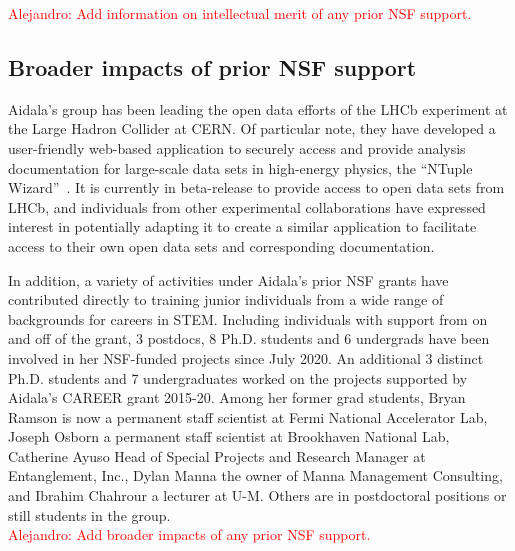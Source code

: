 \textcolor{red}{Alejandro: Add information on intellectual merit of any prior NSF support.}



\subsection{Broader impacts of prior NSF support}
Aidala's group has been leading the open data efforts of the LHCb experiment at the Large Hadron Collider at CERN.  Of particular note, they have developed a user-friendly web-based application to securely access and provide analysis documentation for large-scale data sets in high-energy physics, the ``NTuple Wizard''~\cite{Aidala:2023dai}.  It is currently in beta-release to provide access to open data sets from LHCb, and individuals from other experimental collaborations have expressed interest in potentially adapting it to create a similar application to facilitate access to their own open data sets and corresponding documentation.

In addition, a variety of activities under Aidala's prior NSF grants have contributed directly to training junior individuals from a wide range of backgrounds for careers in STEM.  Including individuals with support from on and off of the grant, 3 postdocs, 8 Ph.D. students and 6 undergrads have been involved in her NSF-funded projects since July 2020. An additional 3 distinct Ph.D. students and 7 undergraduates worked on the projects supported by Aidala's CAREER grant 2015-20.  Among her former grad students, Bryan Ramson is now a permanent staff scientist at Fermi National Accelerator Lab, Joseph Osborn a permanent staff scientist at Brookhaven National Lab, Catherine Ayuso Head of Special Projects and Research Manager at Entanglement, Inc., Dylan Manna the owner of Manna Management Consulting, and Ibrahim Chahrour a lecturer at U-M.  Others are in postdoctoral positions or still students in the group.  \\

\textcolor{red}{Alejandro: Add broader impacts of any prior NSF support.}




\newpage







